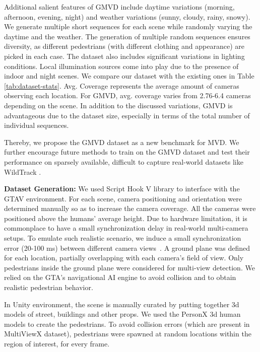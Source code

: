 \documentclass[letterpaper, 10 pt, conference]{ieeeconf}  \usepackage{times}
\newcommand{\wildtrack}{WildTrack }
\begin{document}
Additional salient features of GMVD include daytime variations (morning, afternoon, evening, night) and weather variations (sunny, cloudy, rainy, snowy). We generate multiple short sequences for each scene while randomly varying the daytime and the weather. The generation of multiple random sequences ensures diversity, as different pedestrians (with different clothing and appearance) are picked in each case. The dataset also includes significant variations in lighting conditions. Local illumination sources come into play due to the presence of indoor and night scenes. We compare our dataset with the existing ones in Table \ref{tab:dataset-stats}. Avg. Coverage represents the average amount of cameras observing each location. For GMVD, avg. coverage varies from 2.76-6.4 cameras depending on the scene. In addition to the discussed variations, GMVD is advantageous due to the dataset size, especially in terms of the total number of individual sequences. 

Thereby, we propose the GMVD dataset as a new benchmark for MVD. We further encourage future methods to train on the GMVD dataset and test their performance on sparsely available, difficult to capture real-world datasets like \wildtrack.






\textbf{Dataset Generation:} We used Script Hook V \cite{scripthook} library to interface with the GTAV environment. For each scene, camera positioning and orientation were determined manually so as to increase the camera coverage. All the cameras were positioned above the humans’ average height. Due to hardware limitation, it is commonplace to have a small synchronization delay in real-world multi-camera setups. To emulate such realistic scenario, we induce a small synchronization error (20-100 ms) between different camera views~\cite{Kohl_2020_CVPR_Workshops}. A ground plane was defined for each location, partially overlapping with each camera’s field of view. Only pedestrians inside the ground plane were considered for multi-view detection. We relied on the GTA’s navigational AI engine to avoid collision and to obtain realistic pedestrian behavior. 

In Unity environment, the scene is manually curated by putting together 3d models of street, buildings and other props. We used the PersonX \cite{sun2019dissecting} 3d human models to create the pedestrians. To avoid collision errors (which are present in MultiViewX dataset), pedestrians were spawned at random locations within the region of interest, for every frame.
\end{document}
